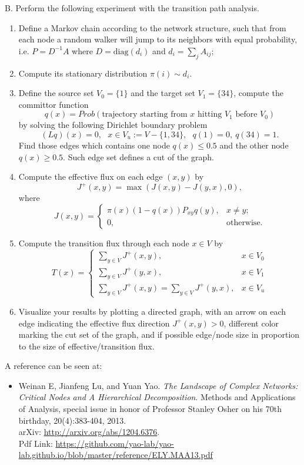\documentclass[11pt]{article}
\def\diag{{\mathrm{diag}}}
\begin{document}
B. Perform the following experiment with the transition path analysis. 
\begin{enumerate}
\item Define a Markov chain according to the network structure, such that from each node a random walker will jump to its neighbors with equal probability, i.e. $P=D^{-1} A$ where $D=\diag(d_i)$ and $d_i = \sum_j A_{ij}$;
\item Compute its stationary distribution $\pi(i)\sim d_i$. 
\item Define the source set $V_0=\{1\}$ and the target set $V_1=\{34\}$, compute the committor function
\[  q(x) = Prob(\mbox{trajectory starting from $x$ hitting $V_1$ before $V_0$}) \]
by solving the following Dirichlet boundary problem
\[ (L q)(x) = 0, \ \ \ x\in V_u := V -\{1,34\}, \ \ \ q(1)=0,\ q(34)=1. \]
Find those edges which contains one node $q(x)\leq 0.5$ and the other node $q(x)\geq 0.5$. Such edge set defines a cut of the graph. 
\item Compute the effective flux on each edge $(x,y)$ by 
\[ J^+(x,y) = \max(J(x,y) - J(y,x), 0 ),\]
where
\[     J(x,y) = 
     \begin{cases}
       \pi(x) (1-q(x)) P_{xy}q(y), & x\neq y;\\
       0, & \text{otherwise}.
     \end{cases}
\]
\item Compute the transition flux through each node $x\in V$ by 
\[
     T(x) = \left\{\begin{array}{ll}
     \sum_{y \in V} J^+(x,y) ,& x\in V_0 \\
     \sum_{y\in V} J^+(y,x), & x\in V_1 \\
     \sum_{y\in V} J^+(x,y) = \sum_{y\in V} J^+(y,x), & x\in V_u 
     \end{array}\right.
\]
\item Visualize your results by plotting a directed graph, with an arrow on each edge indicating the effective flux direction $J^+(x,y)>0$, different color marking the cut set of the graph, and if possible edge/node size in proportion to the size of effective/transition flux.
\end{enumerate}

A reference can be seen at:
\begin{itemize}
\item Weinan E, Jianfeng Lu, and Yuan Yao. {\it The Landscape of Complex Networks: Critical Nodes and A Hierarchical Decomposition}. Methods and Applications of Analysis, special issue in honor of Professor Stanley Osher on his 70th birthday, 20(4):383-404, 2013. \\ arXiv: \url{http://arxiv.org/abs/1204.6376}. \\
Pdf Link: \url{https://github.com/yao-lab/yao-lab.github.io/blob/master/reference/ELY.MAA13.pdf} 
\end{itemize}
\end{document}
